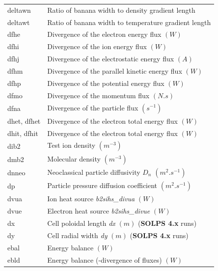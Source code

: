 \documentclass[a4paper,10pt]{report}
\newcommand\SOLPSfour{{\bf SOLPS 4.x} }
\begin{document}
\begin{center}
\begin{longtable}{|l|l|}
    deltawn  & \index{b2plot, deltawn} Ratio of banana width to density gradient length \\
    deltawt  & \index{b2plot, deltawt} Ratio of banana width to temperature gradient length \\
    dfhe     & \index{b2plot, dfhe} Divergence of the electron energy flux $(W)$ \\
    dfhi     & \index{b2plot, dfhi} Divergence of the ion energy flux $(W)$ \\
    dfhj     & \index{b2plot, dfhj} Divergence of the electrostatic energy flux $(A)$ \\
    dfhm     & \index{b2plot, dfhm} Divergence of the parallel kinetic energy flux $(W)$ \\
    dfhp     & \index{b2plot, dfhp} Divergence of the potential energy flux $(W)$ \\
    dfmo     & \index{b2plot, dfmo} Divergence of the momentum flux $(N.s)$ \\
    dfna     & \index{b2plot, dfna} Divergence of the particle flux $(s^{-1})$ \\
    dhet, dfhet     & \index{b2plot, dhet} Divergence of the electron total energy flux $(W)$ \index{b2plot, dfhet} \\
    dhit, dfhit     & \index{b2plot, dhit} Divergence of the electron total energy flux $(W)$ \index{b2plot, dfhit} \\
    dib2     & \index{b2plot, dib2} Test ion density $(m^{-3})$ \\
    dmb2     & \index{b2plot, dmb2} Molecular density $(m^{-3})$ \\
    dnneo    & \index{b2plot, dnneo} Neoclassical particle diffusivity $D_n$ $(m^2.s^{-1})$ \\
    dp       & \index{b2plot, dp} Particle pressure diffusion coefficient $(m^2.s^{-1})$ \\
    dvua     & \index{b2plot, dvua} Ion heat source {\em b2sihs\_divua} $(W)$ \\
    dvue     & \index{b2plot, dvue} Electron heat source {\em b2sihs\_divue} $(W)$ \\
    dx       & \index{b2plot, dx} Cell poloidal length {\em dx} $(m)$ (\SOLPSfour runs) \\
    dy       & \index{b2plot, dy} Cell radial width {\em dy} $(m)$ (\SOLPSfour runs) \\
    ebal     & \index{b2plot, ebal} Energy balance $(W)$ \\
    ebld     & \index{b2plot, ebld} Energy balance (-divergence of fluxes) $(W)$ \\

\end{longtable}
\end{center}
\end{document}
